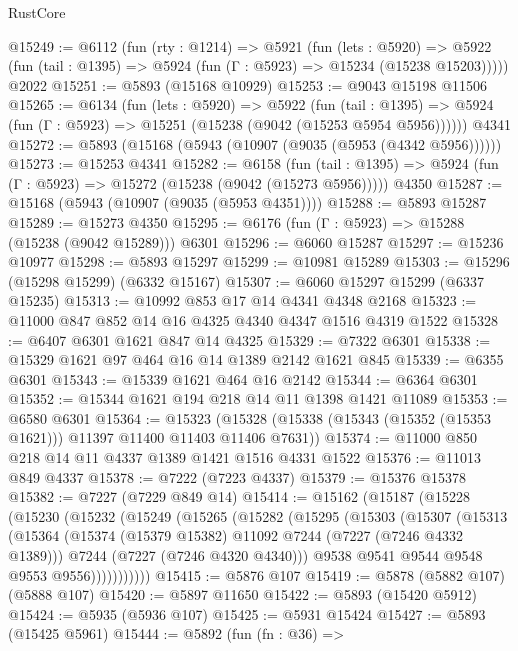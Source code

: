 \begin{lexlean}{RustCore}
\begin{coremodule}
@15249 := @6112
    (fun (rty : @1214) =>
    @5921
      (fun (lets : @5920) =>
      @5922 (fun (tail : @1395) => @5924 (fun (Γ : @5923) => @15234 (@15238 @15203)))))
    @2022
@15251 := @5893 (@15168 @10929)
@15253 := @9043 @15198 @11506
@15265 := @6134
    (fun (lets : @5920) =>
    @5922
      (fun (tail : @1395) =>
      @5924 (fun (Γ : @5923) => @15251 (@15238 (@9042 (@15253 @5954 @5956))))))
    @4341
@15272 := @5893 (@15168 (@5943 (@10907 (@9035 (@5953 (@4342 @5956))))))
@15273 := @15253 @4341
@15282 := @6158
    (fun (tail : @1395) => @5924 (fun (Γ : @5923) => @15272 (@15238 (@9042 (@15273 @5956)))))
    @4350
@15287 := @15168 (@5943 (@10907 (@9035 (@5953 @4351))))
@15288 := @5893 @15287
@15289 := @15273 @4350
@15295 := @6176 (fun (Γ : @5923) => @15288 (@15238 (@9042 @15289))) @6301
@15296 := @6060 @15287
@15297 := @15236 @10977
@15298 := @5893 @15297
@15299 := @10981 @15289
@15303 := @15296 (@15298 @15299) (@6332 @15167)
@15307 := @6060 @15297 @15299 (@6337 @15235)
@15313 := @10992 @853 @17 @14 @4341 @4348 @2168
@15323 := @11000 @847 @852 @14 @16 @4325 @4340 @4347 @1516 @4319 @1522
@15328 := @6407 @6301 @1621 @847 @14 @4325
@15329 := @7322 @6301
@15338 := @15329 @1621 @97 @464 @16 @14 @1389 @2142 @1621 @845
@15339 := @6355 @6301
@15343 := @15339 @1621 @464 @16 @2142
@15344 := @6364 @6301
@15352 := @15344 @1621 @194 @218 @14 @11 @1398 @1421 @11089
@15353 := @6580 @6301
@15364 := @15323
    (@15328 (@15338 (@15343 (@15352 (@15353 @1621))) @11397 @11400 @11403 @11406 @7631))
@15374 := @11000 @850 @218 @14 @11 @4337 @1389 @1421 @1516 @4331 @1522
@15376 := @11013 @849 @4337
@15378 := @7222 (@7223 @4337)
@15379 := @15376 @15378
@15382 := @7227 (@7229 @849 @14)
@15414 := @15162
    (@15187
      (@15228
        (@15230
          (@15232
            (@15249
              (@15265
                (@15282
                  (@15295
                    (@15303
                      (@15307
                        (@15313
                          (@15364
                            (@15374 (@15379 @15382) @11092 @7244 (@7227 (@7246 @4332 @1389)))
                            @7244
                            (@7227 (@7246 @4320 @4340)))
                          @9538
                          @9541
                          @9544
                          @9548
                          @9553
                          @9556)))))))))))
@15415 := @5876 @107
@15419 := @5878 (@5882 @107) (@5888 @107)
@15420 := @5897 @11650
@15422 := @5893 (@15420 @5912)
@15424 := @5935 (@5936 @107)
@15425 := @5931 @15424
@15427 := @5893 (@15425 @5961)
@15444 := @5892
    (fun (fn : @36) =>

\end{coremodule}
\end{lexlean}
